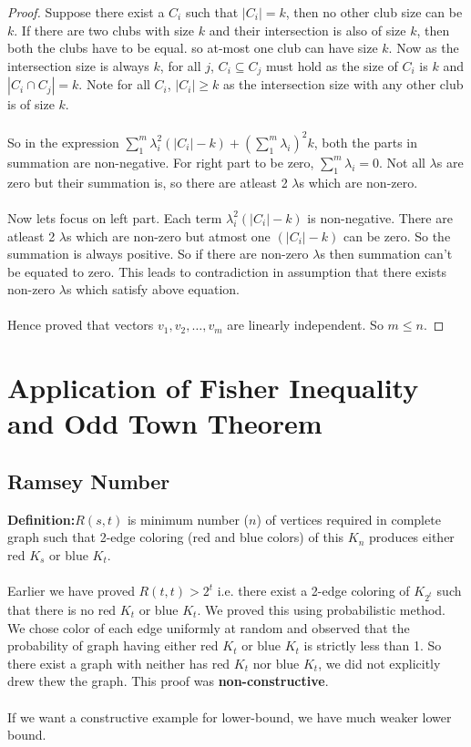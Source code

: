 \begin{theorem}
\begin{proof}
Suppose there exist a $C_i$ such that $|C_i|=k$, then no other club size can be $k$. If there are two clubs with size $k$ and their intersection is also of size $k$, then both the clubs have to be equal. so at-most one club can have size $k$. Now as the intersection size is always $k$, for all $j$, $C_i \subseteq C_j$ must hold as the size of $C_i$ is $k$ and $|C_i \cap C_j |=k$. Note for all $C_i$, $|C_i|\ge k$ as the intersection size with any other club is of size $k$.\\\\
So in the expression $\sum_1^m \lambda_i^2 (|C_i|-k) +(\sum_1^m \lambda_i)^2k$, both the parts in summation are non-negative. For right part to be zero, $\sum_1^m \lambda_i =0$. Not all $\lambda$s are zero but their summation is, so there are atleast 2 $\lambda$s which are non-zero.\\\\
Now lets focus on left part. Each term $\lambda_i^2 (|C_i|-k)$ is non-negative.  There are atleast 2 $\lambda$s which are non-zero but atmost one $(|C_i|-k)$ can be zero. So the summation is always positive. So if there are non-zero $\lambda$s then summation can't be equated to zero. This leads to contradiction in assumption that there exists non-zero $\lambda$s which satisfy above equation.\\\\
Hence proved that vectors $v_1, v_2, \hdots, v_m$ are linearly independent. So $m\le n$.
\end{proof}
\end{theorem}

\section{Application of Fisher Inequality and Odd Town Theorem}
\subsection{Ramsey Number}
\textbf{Definition:}$R(s,t)$ is minimum number ($n$) of vertices required in complete graph such that 2-edge coloring (red and blue colors) of this $K_n$ produces either red $K_s$ or blue $K_t$.\\\\
Earlier we have proved $R(t,t)>2^t$ i.e. there exist a 2-edge coloring of $K_{2^t}$ such that there is no red $K_t$ or blue $K_t$. We proved this using probabilistic method. We chose color of each edge uniformly at random and observed that the probability of graph having either red $K_t$ or blue $K_t$ is strictly less than 1. So there exist a graph with neither has red $K_t$ nor blue $K_t$, we did not explicitly drew thew the graph. This proof was \textbf{non-constructive}.\\\\
If we want a constructive example for lower-bound, we have much weaker lower bound.
